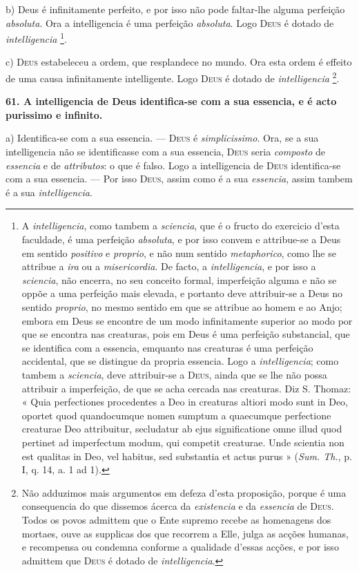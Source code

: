  b) Deus é infinitamente perfeito, e por isso não pode faltar-lhe alguma perfeição \emph{absoluta}. Ora a intelligencia é uma perfeição \emph{absoluta}. Logo \textsc{Deus} é dotado de \emph{intelligencia} \footnote{A \emph{intelligencia}, como tambem a \emph{sciencia}, que é o fructo do exercicio d'esta faculdade, é uma perfeição \emph{absoluta}, e por isso convem e attribue-se a Deus em sentido \emph{positivo} e \emph{proprio}, e não num sentido \emph{metaphorico}, como lhe se attribue a \emph{ira} ou a \emph{misericordia}. De facto, a \emph{intelligencia}, e por isso a \emph{sciencia}, não encerra, no seu conceito formal, imperfeição alguma e não se oppõe a uma perfeição mais elevada, e portanto deve attribuir-se a Deus no sentido \emph{proprio}, no mesmo sentido em que se attribue ao homem e ao Anjo; embora em Deus se encontre de um modo infinitamente superior ao modo por que se encontra nas creaturas, pois em Deus é uma perfeição substancial, que se identifica com a essencia, emquanto nas creaturas é uma perfeição accidental, que se distingue da propria essencia. Logo a \emph{intelligencia}; como tambem a \emph{sciencia}, deve attribuir-se a \textsc{Deus}, ainda que se lhe não possa attribuir a imperfeição, de que se acha cercada nas creaturas. Diz S. Thomaz: « Quia perfectiones procedentes a Deo in creaturas altiori modo sunt in Deo, oportet quod quandocumque nomen sumptum a quaecumque perfectione creaturae Deo attribuitur, secludatur ab ejus significatione omne illud quod pertinet ad imperfectum modum, qui competit creaturae. Unde scientia non est qualitas in Deo, vel habitus, sed substantia et actus purus » (\emph{Sum. Th.}, p. I, q. 14, a. 1 ad 1).}.

 c) \textsc{Deus} estabeleceu a ordem, que resplandece no mundo. Ora esta ordem é effeito de uma causa infinitamente intelligente. Logo \textsc{Deus} é dotado de \emph{intelligencia} \footnote{Não adduzimos mais argumentos em defeza d'esta proposição, porque é uma consequencia do que dissemos ácerca da \emph{existencia} e da \emph{essencia} de \textsc{Deus}. Todos os povos admittem que o Ente supremo recebe as homenagens dos mortaes, ouve as supplicas dos que recorrem a Elle, julga as acções humanas, e recompensa ou condemna conforme a qualidade d'essas acções, e por isso admittem que \textsc{Deus} é dotado de \emph{intelligencia}.}.

\textbf{61. A intelligencia de Deus identifica-se com a sua essencia, e é acto purissimo e infinito.}

a) Identifica-se com a sua essencia. --- \textsc{Deus} é \emph{simplicissimo}. Ora, se a sua intelligencia não se identificasse com a sua essencia, \textsc{Deus} seria \emph{composto} de \emph{essencia} e de \emph{attributos}: o que é falso. Logo a intelligencia de \textsc{Deus} identifica-se com a sua essencia. --- Por isso \textsc{Deus}, assim como é a sua \emph{essencia}, assim tambem é a sua \emph{intelligencia}.

